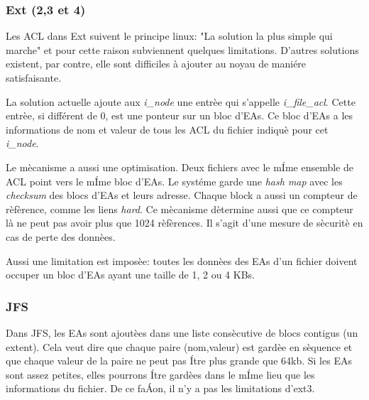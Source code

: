\subsubsection*{Ext (2,3 et 4)}
 
Les ACL dans Ext suivent le principe linux: "La solution la plus simple qui marche" et pour cette raison subviennent quelques limitations. D'autres solutions existent, par contre, elle sont difficiles à ajouter au noyau de maniére satisfaisante\cite{ext_acl}.
 
La solution actuelle ajoute aux \emph{i\_node} une entrèe qui s'appelle \emph{i\_file\_acl}. Cette entrèe, si différent de 0, est une ponteur sur un bloc d'EAs. Ce bloc d'EAs a les informations de nom et valeur de tous les ACL du fichier indiquè pour cet \emph{i\_node}.
 
Le mècanisme a aussi une optimisation. Deux fichiers avec le mÍme ensemble de ACL point vers le mÍme bloc d'EAs. Le systéme garde une \emph{hash map} avec les \emph{checksum} des blocs d'EAs et leurs adresse. Chaque block a aussi un compteur de rèfèrence, comme les liens \emph{hard}. Ce mècanisme dètermine aussi que ce compteur là ne peut pas avoir plus que 1024 rèfèrences. Il s'agit d'une mesure de sècuritè en cas de perte des donnèes.
 
Aussi une limitation est imposèe: toutes les donnèes des EAs d'un fichier doivent occuper un bloc d'EAs ayant une taille de 1, 2 ou 4 KBs.
 
 
\subsubsection*{JFS}
 
Dans JFS, les EAs sont ajoutèes dans une liste consècutive de blocs contigus (un extent).  Cela veut dire que chaque paire (nom,valeur) est gardèe en sèquence et que chaque valeur de la paire ne peut pas Ítre plus grande que 64kb. Si les EAs sont assez petites, elles pourrons Ítre gardèes dans le mÍme lieu que les informations du fichier. De ce faÁon, il n'y a pas les limitations d'ext3.
 
